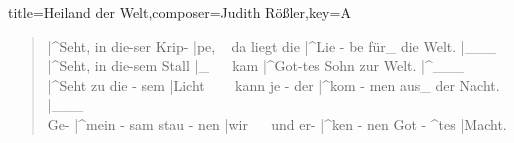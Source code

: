 \documentclass{leadsheet-modern}
\begin{document}
\begin{song}{title={Heiland der Welt},composer={Judith Rößler},key={A}}
\begin{verse}
|^Seht, in die-ser Krip- |pe, \eighthrest~ 
da liegt die |^Lie - be für\_ die Welt. |\_\_\_ \quarterrest~ \\
|^Seht, in die-sem Stall |\_ \eighthrest~\halfrest~ kam 
|^Got-tes Sohn zur Welt. |^\_\_\_ \quarterrest~ \\
|^Seht zu die - sem |Licht \eighthrest~\eighthrest~\eighthrest~ kann 
je - der |^kom - men aus\_ der Nacht. |\_\_\_ \\
Ge- |^mein - sam stau - nen |wir \eighthrest~\eighthrest~ 
und er- |^ken - nen Got - ^tes |Macht. 
\end{verse}

\end{song}
\end{document}
